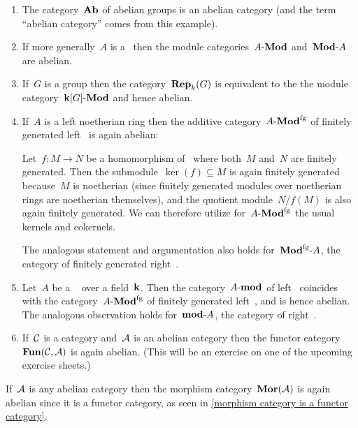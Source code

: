 \begin{example}
  \leavevmode
  \begin{enumerate}
    \item
      The category~$\mathbf{Ab}$ of abelian groups is an abelian category (and the term \enquote{abelian category} comes from this example).
    \item
      If more generally~$A$ is a~{\kalg} then the module categories~$\text{$A$-$\mathbf{Mod}$}$ and~$\text{$\mathbf{Mod}$-$A$}$ are abelian.
    \item
      If~$G$ is a group then the category~$\mathbf{Rep}_{k}(G)$ is equivalent to the the module category~$\text{$\mathbf{k}[G]$-$\mathbf{Mod}$}$ and hence abelian.
    \item
      If~$A$ is a left noetherian ring then the additive category~$\text{$A$-$\mathbf{Mod}^{\mathrm{fg}}$}$ of finitely generated left~{} is again abelian:
      
      Let~$f \colon M \to N$ be a homomorphism of~{} where both~$M$ and~$N$ are finitely generated.
      Then the submodule~$\ker(f) \subseteq M$ is again finitely generated because~$M$ is noetherian (since finitely generated modules over noetherian rings are noetherian themselves), and the quotient module~$N/f(M)$ is also again finitely generated.
      We can therefore utilize for~$\text{$A$-$\mathbf{Mod}^{\mathrm{fg}}$}$ the usual kernels and cokernels.
      
      The analogous statement and argumentation also holds for~$\text{$\mathbf{Mod}^{\mathrm{fg}}$-$A$}$, the category of finitely generated right~{}.
    \item
      Let~$A$ be a {\fd}~{\kalg} over a field~$\mathbf{k}$.
      Then the category~$\text{$A$-$\mathbf{mod}$}$ of {\fd} left~{} coincides with the category~$\text{$A$-$\mathbf{Mod}^{\mathrm{fg}}$}$ of finitely generated left~{}, and is hence abelian.
      The analogous observation holds for~$\text{$\mathbf{mod}$-$A$}$, the category of {\fd} right~{}.
    \item
      If~$\mathcal{C}$ is a category and~$\mathcal{A}$ is an abelian category then the functor category~$\mathbf{Fun}(\mathcal{C}, \mathcal{A})$ is again abelian.
      (This will be an exercise on one of the upcoming exercise sheets.)
  \end{enumerate}
\end{example}


\begin{example*}
  If~$\mathcal{A}$ is any abelian category then the morphism category~$\mathbf{Mor}(\mathcal{A})$ is again abelian since it is a functor category, as seen in \cref{morphism category is a functor category}.
\end{example*}


